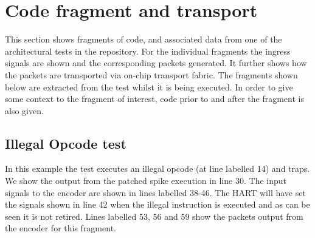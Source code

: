 \chapter{Code fragment and transport}

This section shows fragments of code, and associated data from one of the
architectural tests in the repository. For the individual fragments
the ingress signals are shown and the corresponding packets
generated. It further shows how the packets are transported via on-chip
transport fabric.
The fragments shown below are extracted from the test whilst it is
being executed. In order to give some context to the fragment of
interest, code prior to and after the fragment is also given.  
  
\section {Illegal Opcode test}

In this example the test executes an illegal opcode (at line labelled 14) and
traps. We show the output from the patched spike execution in line 30.
The input signals to the encoder are shown in lines labelled 38-46. The HART
will have set the signals shown in line 42 when the illegal
instruction is executed and as can be seen it is not retired.
Lines labelled 53, 56 and 59 show the packets output from the encoder for this fragment.

